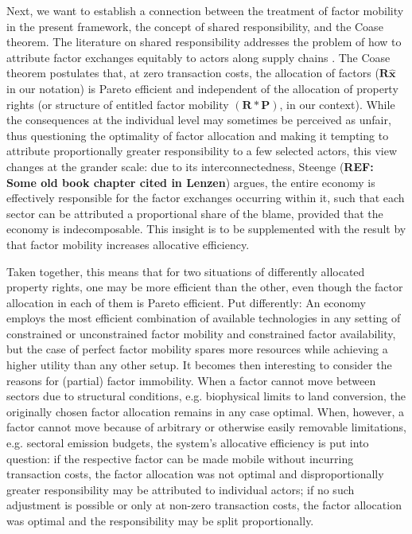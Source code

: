 \documentclass{article}
\begin{document}
\begin{refsection}
Next, we want to establish a connection between the treatment of factor mobility in the present framework, the concept of shared responsibility, and the Coase theorem. The literature on shared responsibility addresses the problem of how to attribute factor exchanges equitably to actors along supply chains \parencite[see for example][]{lenzen_2007}. The Coase theorem \parencite[based on][]{coase_1960} postulates that, at zero transaction costs, the allocation of factors ($\bm{R} \widehat{\bm{x}}$ in our notation) is Pareto efficient and independent of the allocation of property rights (or structure of entitled factor mobility $(\bm{R} \ast \bm{P})$, in our context). While the consequences at the individual level may sometimes be perceived as unfair, thus questioning the optimality of factor allocation and making it tempting to attribute proportionally greater responsibility to a few selected actors, this view changes at the grander scale: due to its interconnectedness, Steenge (\textbf{REF: Some old book chapter cited in Lenzen}) argues, the entire economy is effectively responsible for the factor exchanges occurring within it, such that each sector can be attributed a proportional share of the blame, provided that the economy is indecomposable. This insight is to be supplemented with the result by \textcite{amores_2014} that factor mobility increases allocative efficiency.

Taken together, this means that for two situations of differently allocated property rights, one may be more efficient than the other, even though the factor allocation in each of them is Pareto efficient. Put differently: An economy employs the most efficient combination of available technologies in any setting of constrained or unconstrained factor mobility and constrained factor availability, but the case of perfect factor mobility spares more resources while achieving a higher utility than any other setup. It becomes then interesting to consider the reasons for (partial) factor immobility. When a factor cannot move between sectors due to structural conditions, e.g. biophysical limits to land conversion, the originally chosen factor allocation remains in any case optimal. When, however, a factor cannot move because of arbitrary or otherwise easily removable limitations, e.g. sectoral emission budgets, the system's allocative efficiency is put into question: if the respective factor can be made mobile without incurring transaction costs, the factor allocation was not optimal and disproportionally greater responsibility may be attributed to individual actors; if no such adjustment is possible or only at non-zero transaction costs, the factor allocation was optimal and the responsibility may be split proportionally.


\end{refsection}
\end{document}
